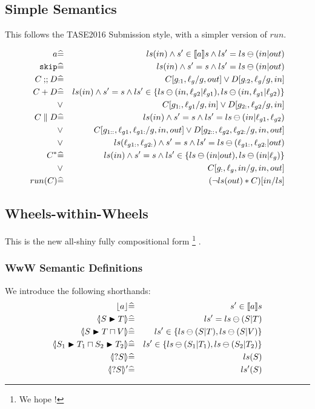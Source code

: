 \subsection{Simple Semantics}

This follows the TASE2016 Submission style,
with a simpler version of $run$.

\begin{eqnarray*}
   a
   &\widehat=&
   ls(in) \land s' \in [\![{a}]\!] s \land ls'=ls \ominus (in|out)
\\ \texttt{skip}
   &\widehat=&
   ls(in) \land s' = s \land ls'=ls \ominus (in|out)
\\ C \mathbin{;\!;} D
   &\widehat=&
   C[g_{:1},\ell_g/g,out] \lor D[g_{:2},\ell_g/g,in]
\\ C + D
   &\widehat=&
   ls(in)
   \land s' = s
   \land ls' \in \{ ls \ominus (in,\ell_{g2}|\ell_{g1})
                  , ls \ominus (in,\ell_{g1}|\ell_{g2})\}
\\ &\lor&
   C[g_{1:},\ell_{g1}/g,in] \lor D[g_{2:},\ell_{g2}/g,in]
\\ C \parallel D
   &\widehat=&
   ls(in)
   \land s' = s
   \land ls'= ls \ominus (in|\ell_{g1},\ell_{g2})
\\ &\lor&
   C[g_{1::},\ell_{g1},\ell_{g1:}/g,in,out]
   \lor D[g_{2::},\ell_{g2},\ell_{g2:}/g,in,out]
\\ &\lor&
   ls(\ell_{g1:},\ell_{g2:})
   \land s' = s
   \land ls'= ls \ominus (\ell_{g1:},\ell_{g2:}|out)
\\ C^*
   &\widehat=&
   ls(in)
   \land s' = s
   \land ls' \in \{ ls \ominus (in|out), ls \ominus (in|\ell_g)\}
\\ &\lor&
   C[g_{:},\ell_g,in/g,in,out]
\\ run(C)
   &\widehat=&
   ( \lnot ls(out) * C)[in/ls]
\end{eqnarray*}


\newpage
\subsection{Wheels-within-Wheels}

This is the new all-shiny fully compositional form%
\footnote{We hope !}%
.


\subsubsection{WwW Semantic Definitions}

We introduce the following shorthands:
\begin{eqnarray*}
   \ado a &\defs& \atomdo a
\\ \LUPD S T &\defs& \lupd S T
\\ \LUPD S {T \ndc V}
   &\defs&
   ls' \in \setof{\lexc S T, \lexc S V}
\\ \LNDC{S_1}{T_1}{S_2}{T_2}
   &\defs&
   ls' \in \setof{\lexc{S_1}{T_1}, \lexc{S_2}{T_2}}
\\ \LS S &\defs& ls(S)
\\ \LSd S &\defs& ls'(S)
\end{eqnarray*}

